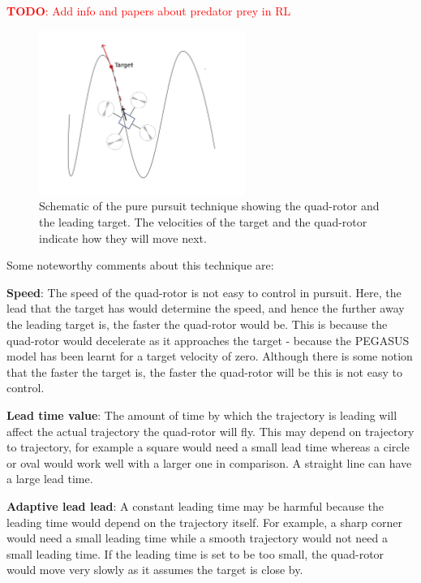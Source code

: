 \documentclass[BTech]{iitmdiss}
\newcommand\todo[1]{\textcolor{red}{{\bf TODO}: #1}}
\begin{document}
\todo{Add info and papers about predator prey in RL}

\begin{figure}[h]
  \centering
    \includegraphics[width=0.6\textwidth]{pursuit.png}
    \caption{Schematic of the pure pursuit technique showing the quad-rotor and the leading target. The velocities of the target and the quad-rotor indicate how they will move next.}
\end{figure}

Some noteworthy comments about this technique are:

{\bf Speed}: The speed of the quad-rotor is not easy to control in pursuit. Here, the lead that the target has would determine the speed, and hence the further away the leading target is, the faster the quad-rotor would be. This is because the quad-rotor would decelerate as it approaches the target - because the PEGASUS model has been learnt for a target velocity of zero. Although there is some notion that the faster the target is, the faster the quad-rotor will be this is not easy to control.

{\bf Lead time value}: The amount of time by which the trajectory is leading will affect the actual trajectory the quad-rotor will fly. This may depend on trajectory to trajectory, for example a square would need a small lead time whereas a circle or oval would work well with a larger one in comparison. A straight line can have a large lead time.

{\bf Adaptive lead lead}: A constant leading time may be harmful because the leading time would depend on the trajectory itself. For example, a sharp corner would need a small leading time while a smooth trajectory would not need a small leading time. If the leading time is set to be too small, the quad-rotor would move very slowly as it assumes the target is close by.
\end{document}
